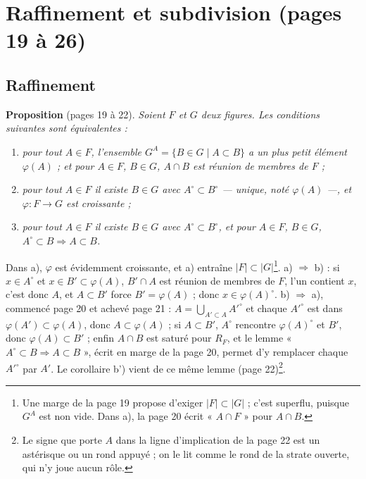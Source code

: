 \documentclass[11pt,a4paper]{article}
\begin{document}
\section*{Raffinement et subdivision (pages 19 à 26)}

\subsection*{Raffinement}

\textbf{Proposition} (pages 19 à 22). \emph{Soient $F$ et $G$ deux figures. Les
conditions suivantes sont équivalentes :}
\begin{enumerate}
\item[a)] \emph{pour tout $A \in F$, l'ensemble $G^{A} = \{B \in G \mid A
\subset B\}$ a un plus petit élément $\varphi(A)$ ; et pour $A \in F$, $B \in
G$, $A \cap B$ est réunion de membres de $F$ ;}
\item[b)] \emph{pour tout $A \in F$ il existe $B \in G$ avec $A^{\circ} \subset
B^{\circ}$ --- unique, noté $\varphi(A)$ ---, et $\varphi : F \to G$ est
croissante ;}
\item[b')] \emph{pour tout $A \in F$ il existe $B \in G$ avec $A^{\circ} \subset
B^{\circ}$, et pour $A \in F$, $B \in G$, $A^{\circ} \subset B \Rightarrow A
\subset B$.}
\end{enumerate}

Dans a), $\varphi$ est évidemment croissante, et a) entraîne $|F| \subset
|G|$\footnote{Une marge de la page 19 propose d'exiger $|F| \subset |G|$ ; c'est
superflu, puisque $G^{A}$ est non vide. Dans a), la page 20 écrit « $A \cap F$ »
pour $A \cap B$.}. a) $\Rightarrow$ b) : si $x \in A^{\circ}$ et $x \in B'
\subset \varphi(A)$, $B' \cap A$ est réunion de membres de $F$, l'un contient
$x$, c'est donc $A$, et $A \subset B'$ force $B' = \varphi(A)$ ; donc $x \in
\varphi(A)^{\circ}$. b) $\Rightarrow$ a), commencé page 20 et achevé page 21 :
$A = \bigcup_{A' \subset A} A'^{\circ}$ et chaque $A'^{\circ}$ est dans
$\varphi(A') \subset \varphi(A)$, donc $A \subset \varphi(A)$ ; si $A \subset
B'$, $A^{\circ}$ rencontre $\varphi(A)^{\circ}$ et $B'$, donc $\varphi(A)
\subset B'$ ; enfin $A \cap B$ est saturé pour $R_{F}$, et le lemme « $A^{\circ}
\subset B \Rightarrow A \subset B$ », écrit en marge de la page 20, permet d'y
remplacer chaque $A'^{\circ}$ par $A'$. Le corollaire b') vient de ce même
lemme (page 22)\footnote{Le signe que porte $A$ dans la ligne d'implication de
la page 22 est un astérisque ou un rond appuyé ; on le lit comme le rond de la
strate ouverte, qui n'y joue aucun rôle.}.
\end{document}

